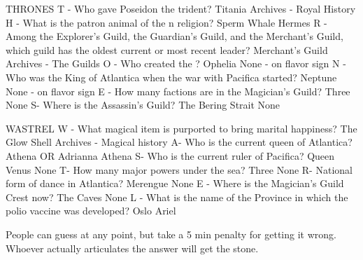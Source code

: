 \documentclass[green]{NeptuneBall}
\begin{document}
\name{\gWishingStone{}}

THRONES
T - Who gave Poseidon the trident?
Titania
Archives - Royal History
H - What is the patron animal of the \pAtlantis{}n religion?
Sperm Whale
Hermes
R -  Among the Explorer's Guild, the Guardian's Guild, and the Merchant's Guild, which guild has the oldest current or most recent leader?
Merchant’s Guild
Archives - The Guilds
O - Who created the \sArtifactTwo{}?
Ophelia
None - on flavor sign
N - Who was the King of Atlantica when the war with Pacifica started?
Neptune
None - on flavor sign
E - How many factions are in the Magician’s Guild?
Three
None
S- Where is the Assassin's Guild?
The Bering Strait
None

WASTREL
W - What magical item is purported to bring marital happiness?
The Glow Shell
Archives - Magical history
A- Who is the current queen of Atlantica?
Athena OR Adrianna
Athena
S- Who is the current ruler of Pacifica?
Queen Venus
None
T- How many major powers under the sea?
Three
None
R- National form of dance in Atlantica?
Merengue
None
E - Where is the Magician's Guild Crest now?
The Caves
None
L - What is the name of the Province in which the polio vaccine was developed?
Oslo
Ariel

People can guess at any point, but take a 5 min penalty for getting it wrong. Whoever actually articulates the answer will get the stone.
\end{document}
